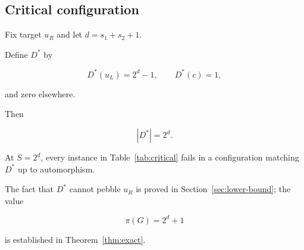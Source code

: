 \subsection{Critical configuration}

\label{sec:critical-def}


\begin{definition}

\label{def:critical}


Fix target $u_R$ and let $d=s_1+s_2+1$.

Define $D^*$ by

\[
D^*(u_L)=2^d-1,\qquad
D^*(c)=1,
\]

and zero elsewhere.

Then

\[
|D^*|=2^d.
\]

\end{definition}


At $S=2^d$, every instance in Table~\ref{tab:critical} fails in a
configuration matching $D^*$ up to automorphism.

The fact that $D^*$ cannot pebble $u_R$ is proved in
Section~\ref{sec:lower-bound}; the value

\[
\pi(G)=2^d+1
\]

is established in Theorem~\ref{thm:exact}.